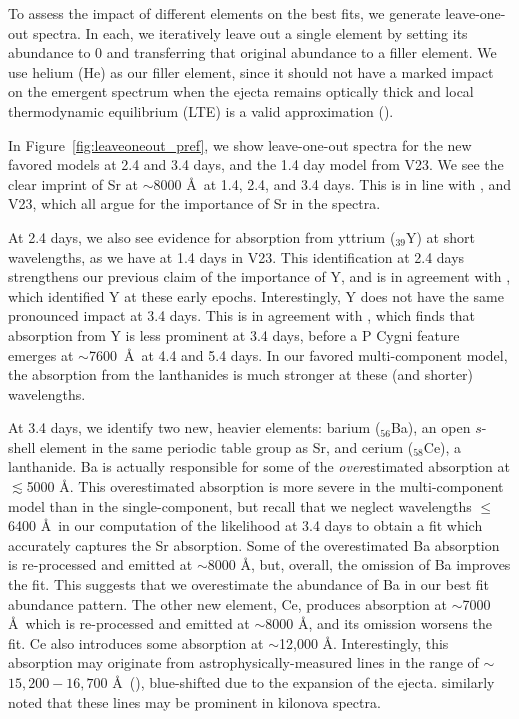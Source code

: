 \documentclass[twocolumn,twocolappendix]{aastex63}
\begin{document}
To assess the impact of different elements on the best fits, we generate leave-one-out spectra. In each, we iteratively leave out a single element by setting its abundance to 0 and transferring that original abundance to a filler element. We use helium (He) as our filler element, since it should not have a marked impact on the emergent spectrum when the ejecta remains optically thick and local thermodynamic equilibrium (LTE) is a valid approximation (\citealt{perego22, tarumi23}).

In Figure~\ref{fig:leaveoneout_pref}, we show leave-one-out spectra for the new favored models at 2.4 and 3.4 days, and the 1.4 day model from V23. We see the clear imprint of Sr at $\sim$8000 \AA~at 1.4, 2.4, and 3.4 days. This is in line with \cite{watson19, gillanders22, domoto21, domoto22, sneppen23, sneppenwatson23}, and V23, which all argue for the importance of Sr in the spectra. 

At 2.4 days, we also see evidence for absorption from yttrium (${}_{39}$Y) at short wavelengths, as we have at 1.4 days in V23. This identification at 2.4 days strengthens our previous claim of the importance of Y, and is in agreement with \cite{gillanders22}, which identified Y at these early epochs. Interestingly, Y does not have the same pronounced impact at 3.4 days. This is in agreement with \cite{sneppenwatson23}, which finds that absorption from Y is less prominent at 3.4 days, before a P Cygni feature emerges at $\sim$7600~\AA~at 4.4 and 5.4 days. In our favored multi-component model, the absorption from the lanthanides is much stronger at these (and shorter) wavelengths. 

At 3.4 days, we identify two new, heavier elements: barium (${}_{56}$Ba), an open $s$-shell element in the same periodic table group as Sr, and cerium (${}_{58}$Ce), a lanthanide. Ba is actually responsible for some of the \textit{over}estimated absorption at $\lesssim$5000 \AA. This overestimated absorption is more severe in the multi-component model than in the single-component, but recall that we neglect wavelengths $\leqslant$6400 \AA~in our computation of the likelihood at 3.4 days to obtain a fit which accurately captures the Sr absorption. Some of the overestimated Ba absorption is re-processed and emitted at $\sim$8000 \AA, but, overall, the omission of Ba improves the fit. This suggests that we overestimate the abundance of Ba in our best fit abundance pattern. The other new element, Ce, produces absorption at $\sim$7000 \AA~which is re-processed and emitted at $\sim$8000 \AA, and its omission worsens the fit. Ce also introduces some absorption at $\sim$12,000 \AA. Interestingly, this absorption may originate from astrophysically-measured  lines in the range of $\sim$$15,200 - 16,700$ \AA~(\citealt{cunha17, majewski17}), blue-shifted due to the expansion of the ejecta. \cite{domoto21} similarly noted that these  lines may be prominent in kilonova spectra.
\end{document}
